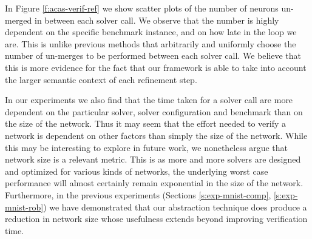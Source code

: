 In Figure \ref{f:acas-verif-ref} we show scatter plots of the number of neurons
un-merged in between each solver call. We observe that the number is highly
dependent on the specific benchmark instance,
and on how late in the \cegar loop we are. This is unlike previous methods
that arbitrarily and uniformly choose the number of un-merges
\cite{cegar-nn} to be performed between each solver call. We believe
that this is more evidence for the fact that our framework is able to take into
account the larger semantic context of each refinement step. 

In our experiments we also find that the time taken for a solver call are more
dependent on the particular solver, solver configuration and benchmark than on
the size of the network. Thus it may seem that the effort needed to verify a
network is dependent on other factors than simply the size of the network. While
this may be interesting to explore in future work, we nonetheless argue that
network size is a relevant metric. This is as more and more solvers are designed
and optimized for various kinds of networks, the underlying worst case
performance will almost certainly remain exponential in the size of the network.
Furthermore, in the previous experiments (Sections \ref{s:exp-mnist-comp},
\ref{s:exp-mnist-rob}) we have demonstrated that our abstraction technique does
produce a reduction in network size whose usefulness extends beyond improving
verification time. 

